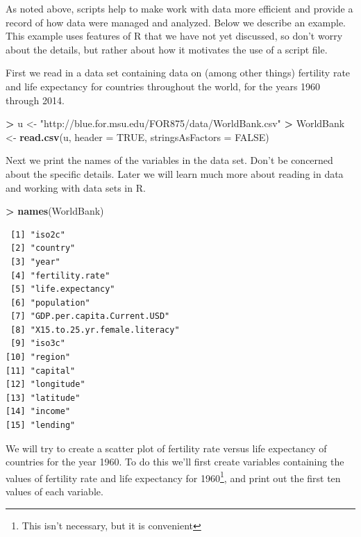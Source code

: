 \documentclass[]{krantz}
\makeatletter
\newenvironment{Shaded}{\begin{snugshade}}{\end{snugshade}}
\newcommand{\DataTypeTok}[1]{\textcolor[rgb]{0.27,0.27,0.27}{#1}}
\newcommand{\KeywordTok}[1]{\textcolor[rgb]{0.27,0.27,0.27}{\textbf{#1}}}
\newcommand{\NormalTok}[1]{#1}
\newcommand{\OperatorTok}[1]{\textcolor[rgb]{0.43,0.43,0.43}{\textbf{#1}}}
\newcommand{\OtherTok}[1]{\textcolor[rgb]{0.37,0.37,0.37}{#1}}
\newcommand{\StringTok}[1]{\textcolor[rgb]{0.5,0.5,0.5}{#1}}
\newenvironment{kframe}{%
\medskip{}
\setlength{\fboxsep}{.8em}
 \def\at@end@of@kframe{}%
 \ifinner\ifhmode%
  \def\at@end@of@kframe{\end{minipage}}%
  \begin{minipage}{\columnwidth}%
 \fi\fi%
 \def\FrameCommand##1{\hskip\@totalleftmargin \hskip-\fboxsep
 \colorbox{shadecolor}{##1}\hskip-\fboxsep
     \hskip-\linewidth \hskip-\@totalleftmargin \hskip\columnwidth}%
 \MakeFramed {\advance\hsize-\width
   \@totalleftmargin\z@ \linewidth\hsize
   \@setminipage}}%
 {\par\unskip\endMakeFramed%
 \at@end@of@kframe}
\renewenvironment{Shaded}{\begin{kframe}}{\end{kframe}}
\makeatother
\begin{document}
As noted above, scripts help to make work with data more efficient and provide a record of how data were managed and analyzed. Below we describe an example. This example uses features of R that we have not yet discussed, so don't worry about the details, but rather about how it motivates the use of a script file.

First we read in a data set containing data on (among other things) fertility rate and life expectancy for countries throughout the world, for the years 1960 through 2014.

\begin{Shaded}
\begin{Highlighting}[]
\OperatorTok{>}\StringTok{ }\NormalTok{u <-}\StringTok{ "http://blue.for.msu.edu/FOR875/data/WorldBank.csv"}
\OperatorTok{>}\StringTok{ }\NormalTok{WorldBank <-}\StringTok{ }\KeywordTok{read.csv}\NormalTok{(u, }\DataTypeTok{header =} \OtherTok{TRUE}\NormalTok{, }\DataTypeTok{stringsAsFactors =} \OtherTok{FALSE}\NormalTok{)}
\end{Highlighting}
\end{Shaded}

Next we print the names of the variables in the data set. Don't be concerned about the specific details. Later we will learn much more about reading in data and working with data sets in R.

\begin{Shaded}
\begin{Highlighting}[]
\OperatorTok{>}\StringTok{ }\KeywordTok{names}\NormalTok{(WorldBank)}
\end{Highlighting}
\end{Shaded}

\begin{verbatim}
 [1] "iso2c"                       
 [2] "country"                     
 [3] "year"                        
 [4] "fertility.rate"              
 [5] "life.expectancy"             
 [6] "population"                  
 [7] "GDP.per.capita.Current.USD"  
 [8] "X15.to.25.yr.female.literacy"
 [9] "iso3c"                       
[10] "region"                      
[11] "capital"                     
[12] "longitude"                   
[13] "latitude"                    
[14] "income"                      
[15] "lending"                     
\end{verbatim}

We will try to create a scatter plot of fertility rate versus life expectancy of countries for the year 1960. To do this we'll first create variables containing the values of fertility rate and life expectancy for 1960\footnote{This isn't necessary, but it is convenient}, and print out the first ten values of each variable.
\end{document}
